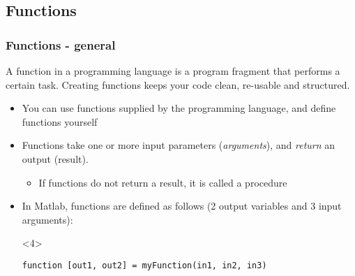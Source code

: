 \documentclass[11pt,table,final,fleqn,xcolor={usenames,dvipsnames},unknownkeysallowed]{beamer}
\begin{document}
\subsection*{Functions}
\begin{frame}[fragile]
 \frametitle{Functions - general}
 A function in a programming language is a program fragment that performs a certain task. Creating functions keeps your code clean, re-usable and structured.
 \begin{itemize}
    \item You can use functions supplied by the programming language, and define functions yourself
    \item Functions take one or more input parameters (\emph{arguments}), and \emph{return} an output (result).
   \begin{itemize}
      \item If functions do not return a result, it is called a procedure
   \end{itemize}
    \item In Matlab, functions are defined as follows (2 output variables and 3 input arguments):
  \begin{overlayarea}{\textwidth}{2em}
   \begin{onlyenv}<4>
    \begin{lstlisting}
function [out1, out2] = myFunction(in1, in2, in3)
    \end{lstlisting}
    \end{onlyenv}
   \end{overlayarea}
  \end{itemize}
\end{frame}
\end{document}
